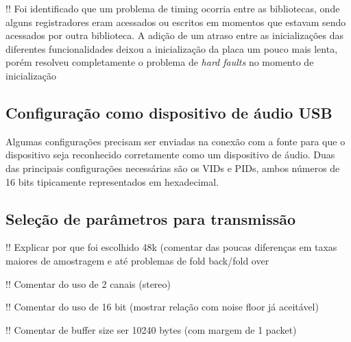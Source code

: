 !! Foi identificado que um problema de timing ocorria entre as bibliotecas, onde alguns registradores eram acessados ou escritos em momentos que estavam sendo acessados por outra biblioteca. A adição de um atraso entre as inicializações das diferentes funcionalidades deixou a inicialização da placa um pouco mais lenta, porém resolveu completamente o problema de \textit{hard faults} no momento de inicialização





\subsection{Configuração como dispositivo de áudio USB}
Algumas configurações precisam ser enviadas na conexão com a fonte para que o dispositivo seja reconhecido corretamente como um dispositivo de áudio. Duas das principais configurações necessárias são os VIDs e PIDs, ambos números de 16 bits tipicamente representados em hexadecimal.

\subsection{Seleção de parâmetros para transmissão}

!! Explicar por que foi escolhido 48k (comentar das poucas diferenças em taxas maiores de amostragem e até problemas de fold back/fold over

!! Comentar do uso de 2 canais (stereo)

!! Comentar do uso de 16 bit (mostrar relação com noise floor já aceitável)

!! Comentar de buffer size ser 10240 bytes (com margem de 1 packet)


